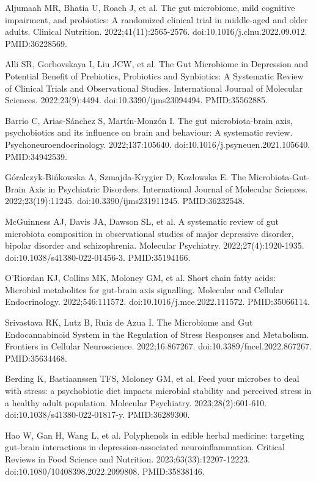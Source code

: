 \documentclass[12pt,oneside]{book}
\newcommand{\reff}[2]{\par\hangindent=7mm\hangafter=1\noindent[#1]\hspace{2mm}#2\par}
\begin{document}
\reff{15}{Aljumaah MR, Bhatia U, Roach J, et al. The gut microbiome, mild cognitive impairment, and probiotics: A randomized clinical trial in middle-aged and older adults. Clinical Nutrition. 2022;41(11):2565-2576. doi:10.1016/j.clnu.2022.09.012. PMID:36228569.}

\reff{16}{Alli SR, Gorbovskaya I, Liu JCW, et al. The Gut Microbiome in Depression and Potential Benefit of Prebiotics, Probiotics and Synbiotics: A Systematic Review of Clinical Trials and Observational Studies. International Journal of Molecular Sciences. 2022;23(9):4494. doi:10.3390/ijms23094494. PMID:35562885.}

\reff{17}{Barrio C, Arias-Sánchez S, Martín-Monzón I. The gut microbiota-brain axis, psychobiotics and its influence on brain and behaviour: A systematic review. Psychoneuroendocrinology. 2022;137:105640. doi:10.1016/j.psyneuen.2021.105640. PMID:34942539.}

\reff{18}{Góralczyk-Bińkowska A, Szmajda-Krygier D, Kozłowska E. The Microbiota-Gut-Brain Axis in Psychiatric Disorders. International Journal of Molecular Sciences. 2022;23(19):11245. doi:10.3390/ijms231911245. PMID:36232548.}

\reff{19}{McGuinness AJ, Davis JA, Dawson SL, et al. A systematic review of gut microbiota composition in observational studies of major depressive disorder, bipolar disorder and schizophrenia. Molecular Psychiatry. 2022;27(4):1920-1935. doi:10.1038/s41380-022-01456-3. PMID:35194166.}

\reff{20}{O'Riordan KJ, Collins MK, Moloney GM, et al. Short chain fatty acids: Microbial metabolites for gut-brain axis signalling. Molecular and Cellular Endocrinology. 2022;546:111572. doi:10.1016/j.mce.2022.111572. PMID:35066114.}

\reff{21}{Srivastava RK, Lutz B, Ruiz de Azua I. The Microbiome and Gut Endocannabinoid System in the Regulation of Stress Responses and Metabolism. Frontiers in Cellular Neuroscience. 2022;16:867267. doi:10.3389/fncel.2022.867267. PMID:35634468.}

\reff{22}{Berding K, Bastiaanssen TFS, Moloney GM, et al. Feed your microbes to deal with stress: a psychobiotic diet impacts microbial stability and perceived stress in a healthy adult population. Molecular Psychiatry. 2023;28(2):601-610. doi:10.1038/s41380-022-01817-y. PMID:36289300.}

\reff{23}{Hao W, Gan H, Wang L, et al. Polyphenols in edible herbal medicine: targeting gut-brain interactions in depression-associated neuroinflammation. Critical Reviews in Food Science and Nutrition. 2023;63(33):12207-12223. doi:10.1080/10408398.2022.2099808. PMID:35838146.}
\end{document}
